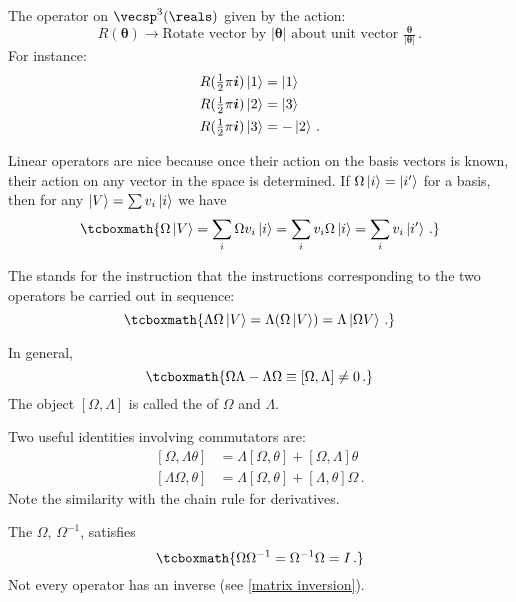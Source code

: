 \begin{example}
The operator on $\vecsp^3(\reals)$ given by the action:
\[ R(\bm{\theta}) \rightarrow \text{Rotate vector by } |\bm{\theta}| \text{ about unit vector } \tfrac{\bm{\theta}}{|\bm{\theta}|}\,.\]
For instance:
\begin{align}
    R(\tfrac{1}{2}\pi \bm{i})\ket{1} &= \ket{1} \\
    R(\tfrac{1}{2}\pi \bm{i})\ket{2} &= \ket{3} \\
    R(\tfrac{1}{2}\pi \bm{i})\ket{3} &= -\ket{2}\,.
\end{align}
\end{example}

Linear operators are nice because once their action on the basis vectors is known, their action on any vector in the space is determined. If $\Omega\ket{i} = \ket{i'}$ for a basis, then for any $\ket{V} = \sum v_i \ket{i}$ we have
\begin{equation}\label{linear operator action on arbitrary vector}
    \tcboxmath{\Omega\ket{V} = \sum_i \Omega v_i\ket{i} = \sum_i v_i \Omega\ket{i} = \sum_i v_i\ket{i'}\,.}
\end{equation}

The  stands for the instruction that the instructions corresponding to the two operators be carried out in sequence:
\begin{equation}\label{operator product}
    \tcboxmath{\Lambda\Omega\ket{V} = \Lambda(\Omega\ket{V}) = \Lambda\ket{\Omega V}\,.}
\end{equation}

In general,
\begin{equation}\label{commutator}
    \tcboxmath{\Omega\Lambda - \Lambda\Omega \equiv [\Omega, \Lambda] \neq 0\,.}
\end{equation}
The object $[\Omega, \Lambda]$ is called the  of $\Omega$ and $\Lambda$.

Two useful identities involving commutators are:
\begin{align}\label{commutator identities}
    [\Omega, \Lambda \theta] &= \Lambda[\Omega, \theta] + [\Omega, \Lambda]\theta \\
    [\Lambda \Omega, \theta] &= \Lambda[\Omega, \theta] + [\Lambda, \theta]\Omega\,. 
\end{align}
Note the similarity with the chain rule for derivatives.

The  $\Omega$, $\Omega^{-1}$, satisfies
\begin{equation}\label{operator inverse}
    \tcboxmath{\Omega\Omega^{-1} = \Omega^{-1}\Omega = I\,.}
\end{equation}
Not every operator has an inverse (see \eqref{matrix inversion}).

